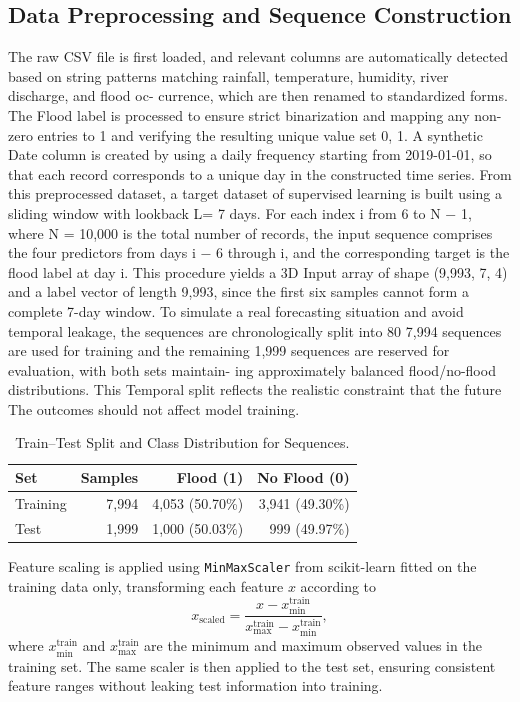 \documentclass[conference]{IEEEtran}
\begin{document}
\subsection{Data Preprocessing and Sequence Construction}
The raw CSV file is first loaded, and relevant columns
are automatically detected based on string patterns matching
rainfall, temperature, humidity, river discharge, and flood oc-
currence, which are then renamed to standardized forms. The
Flood label is processed to ensure strict binarization and mapping
any non-zero entries to 1 and verifying the resulting unique
value set {0, 1}. A synthetic Date column is created by using a
daily frequency starting from 2019-01-01, so that each record
corresponds to a unique day in the constructed time series.
From this preprocessed dataset, a target dataset of supervised learning is
built using a sliding window with lookback L= 7 days.
For each index i from 6 to N − 1, where N = 10,000 is the
total number of records, the input sequence comprises the four
predictors from days i − 6 through i, and the corresponding
target is the flood label at day i. This procedure yields a 3D
Input array of shape (9,993, 7, 4) and a label vector of length
9,993, since the first six samples cannot form a complete 7-day
window.
To simulate a real forecasting situation and avoid
temporal leakage, the sequences are chronologically split into
80%
7,994 sequences are used for training and the remaining 1,999
sequences are reserved for evaluation, with both sets maintain-
ing approximately balanced flood/no-flood distributions. This
Temporal split reflects the realistic constraint that the future
The outcomes should not affect model training. 

\begin{table}[htbp]
\caption{Train--Test Split and Class Distribution for Sequences.}
\centering
\begin{tabular}{lrrr}
\toprule
\textbf{Set} & \textbf{Samples} & \textbf{Flood (1)} & \textbf{No Flood (0)} \\
\midrule
Training & 7{,}994 & 4{,}053 (50.70\%) & 3{,}941 (49.30\%) \\
Test     & 1{,}999 & 1{,}000 (50.03\%) & 999 (49.97\%) \\
\bottomrule
\end{tabular}
\label{tab:split}
\end{table}

Feature scaling is applied using \texttt{MinMaxScaler} from scikit-learn fitted on the training data only, transforming each feature \(x\) according to
\[
x_{\text{scaled}} = \frac{x - x_{\min}^{\text{train}}}{x_{\max}^{\text{train}} - x_{\min}^{\text{train}}},
\]
where \(x_{\min}^{\text{train}}\) and \(x_{\max}^{\text{train}}\) are the minimum and maximum observed values in the training set. The same scaler is then applied to the test set, ensuring consistent feature ranges without leaking test information into training. 
\end{document}
